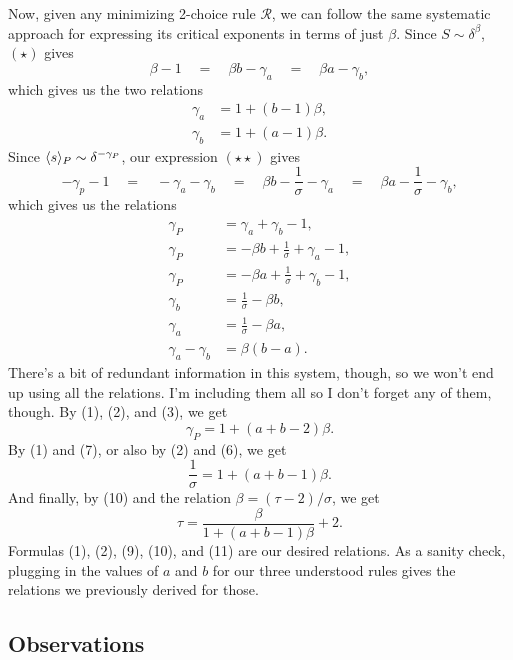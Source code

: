 \documentclass[twoside,10pt]{article}
\begin{document}
Now, given any minimizing 2-choice rule $\mathcal{R}$, we can follow the same systematic approach for expressing its critical exponents in terms of just $\beta$. Since $S \sim \delta^{\beta}$, $(\star)$ gives
\[
\beta-1 \quad=\quad \beta b-\gamma_{a} \quad=\quad \beta a-\gamma_{b},
\] which gives us the two relations
\begin{align}
	\gamma_{a} &= 1+(b-1)\beta, \\
	\gamma_{b} &= 1+(a-1)\beta.
\end{align}
Since $\langle s \rangle_{P} \sim \delta^{-\gamma_{P}}$, our expression $(\star\star)$ gives
\[
-\gamma_p-1 \quad=\quad -\gamma_a-\gamma_b \quad=\quad \beta b-\frac{1}{\sigma} -\gamma_a \quad=\quad \beta a - \frac{1}{\sigma} -\gamma_b,
\] which gives us the relations
\begin{align}
	\gamma_P &= \gamma_{a}+\gamma_{b}-1,\\
	\gamma_{P} &= -\beta b + \frac{1}{\sigma} +\gamma_{a}-1,\\
	\gamma_{P} &= -\beta a + \frac{1}{\sigma} +\gamma_{b}-1,\\
	\gamma_{b} &= \frac{1}{\sigma} -\beta b,\\
	\gamma_{a} &= \frac{1}{\sigma} -\beta a,\\
	\gamma_{a}-\gamma_{b} &= \beta(b-a).
\end{align}
There's a bit of redundant information in this system, though, so we won't end up using all the relations. I'm including them all so I don't forget any of them, though. By (1), (2), and (3), we get
\begin{equation}
	\gamma_{P} = 1 + (a+b-2)\beta.
\end{equation}
By (1) and (7), or also by (2) and (6), we get
\begin{equation}
	\frac{1}{\sigma} = 1 + (a+b-1)\beta.
\end{equation}
And finally, by (10) and the relation $\beta = (\tau-2)/\sigma$, we get
\begin{equation}
	\tau = \frac{\beta}{1 + (a+b-1)\beta} +2.
\end{equation}
Formulas (1), (2), (9), (10), and (11) are our desired relations. As a sanity check, plugging in the values of $a$ and $b$ for our three understood rules gives the relations we previously derived for those.

\subsection{Observations}
\end{document}
